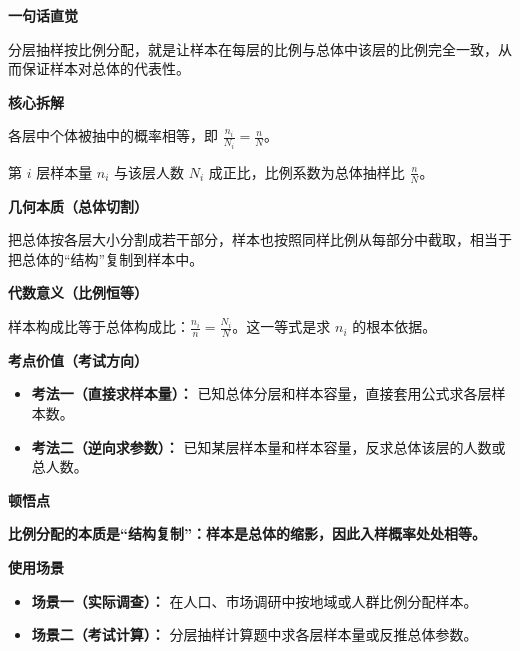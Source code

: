 \begin{explanationbox}
	\textbf{\textcolor{CExplanation}{一句话直觉}}

	分层抽样按比例分配，就是让样本在每层的比例与总体中该层的比例完全一致，从而保证样本对总体的代表性。

	\medskip
	\textbf{\textcolor{CExplanation}{核心拆解}}
	\begin{description}[style=nextline, leftmargin=2.8em, labelsep=0.5em, itemsep=0.45em]
		\item[\textbf{要点一（恒定抽样比）：}] 各层中个体被抽中的概率相等，即 $\frac{n_i}{N_i} = \frac{n}{N}$。
		\item[\textbf{要点二（正比关系）：}] 第 $i$ 层样本量 $n_i$ 与该层人数 $N_i$ 成正比，比例系数为总体抽样比 $\frac{n}{N}$。
	\end{description}

	\medskip
	\textbf{\textcolor{CExplanation}{几何本质（总体切割）}}

	把总体按各层大小分割成若干部分，样本也按照同样比例从每部分中截取，相当于把总体的“结构”复制到样本中。

	\medskip
	\textbf{\textcolor{CExplanation}{代数意义（比例恒等）}}

	样本构成比等于总体构成比：$\frac{n_i}{n} = \frac{N_i}{N}$。这一等式是求 $n_i$ 的根本依据。

	\medskip
	\textbf{\textcolor{CExplanation}{考点价值（考试方向）}}
	\begin{itemize}[leftmargin=*, itemsep=0.5em, topsep=0.4em]
		\item \textbf{考法一（直接求样本量）：} 已知总体分层和样本容量，直接套用公式求各层样本数。
		\item \textbf{考法二（逆向求参数）：} 已知某层样本量和样本容量，反求总体该层的人数或总人数。
	\end{itemize}

	\medskip
	\textbf{\textcolor{CExplanation}{顿悟点}}

	\textbf{比例分配的本质是“结构复制”：样本是总体的缩影，因此入样概率处处相等。}

	\medskip
	\textbf{\textcolor{CExplanation}{使用场景}}
	\begin{itemize}[leftmargin=*, itemsep=0.5em, topsep=0.4em]
		\item \textbf{场景一（实际调查）：} 在人口、市场调研中按地域或人群比例分配样本。
		\item \textbf{场景二（考试计算）：} 分层抽样计算题中求各层样本量或反推总体参数。
	\end{itemize}
\end{explanationbox}

